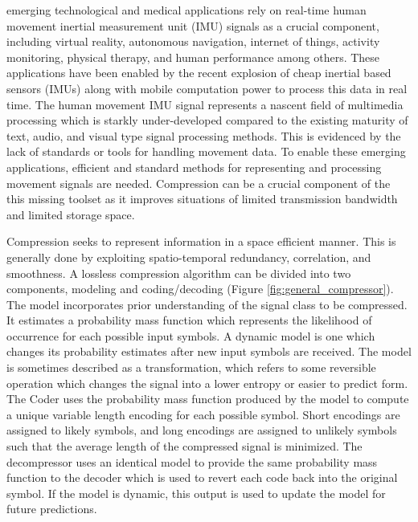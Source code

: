 \documentclass[journal]{IEEEtran}
\begin{document}
 emerging technological and medical applications rely on real-time human movement inertial measurement unit (IMU) signals as a crucial component, including virtual reality\cite{Ahmad2013}, autonomous navigation\cite{Campbell2018}, internet of things\cite{Fernandez-Carames2018}, activity monitoring\cite{Yang2010}\cite{Filippeschi2017}, physical therapy\cite{Patel2012}\cite{Shull2014}, and human performance\cite{Camomilla2018}\cite{GobinathAroganam2019} among others. These applications have been enabled by the recent explosion of cheap inertial based sensors (IMUs) along with mobile computation power to process this data in real time. The human movement IMU signal represents a nascent field of multimedia processing which is starkly under-developed compared to the existing maturity of text, audio, and visual type signal processing methods. This is evidenced by the lack of standards or tools for handling movement data. To enable these emerging applications, efficient and standard methods for representing and processing movement signals are needed. Compression can be a crucial component of the this missing toolset as it improves situations of limited transmission bandwidth and limited storage space.

Compression seeks to represent information in a space efficient manner. This is generally done by exploiting spatio-temporal redundancy, correlation, and smoothness\cite{Sayood2006}. A lossless compression algorithm can be divided into two components, modeling and coding/decoding (Figure \ref{fig:general_compressor})\cite{Nelson1996}. The model incorporates prior understanding of the signal class to be compressed. It estimates a probability mass function which represents the likelihood of occurrence for each possible input symbols. A dynamic model is one which changes its probability estimates after new input symbols are received. The model is sometimes described as a transformation, which refers to some reversible operation which changes the signal into a lower entropy or easier to predict form.  The Coder uses the probability mass function produced by the model to compute a unique variable length encoding for each possible symbol. Short encodings are assigned to likely symbols, and long encodings are assigned to unlikely symbols such that the average length of the compressed signal is minimized. The decompressor uses an identical model to provide the same probability mass function to the decoder which is used to revert each code back into the original symbol. If the model is dynamic, this output is used to update the model for future predictions.
\end{document}
